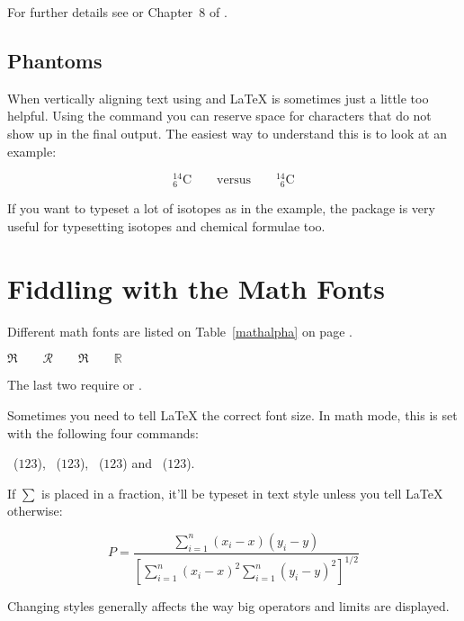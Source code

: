 For further details see \cite{amstestmath} or Chapter~8 of \companion{}.

\subsection{Phantoms}

When vertically aligning text using \ai{\^} and \ai{\_} \LaTeX{} is sometimes
just a little too helpful. Using the  command you can
reserve space for characters that do not show up in the final output.
The easiest way to understand this is to look at an example:
\begin{example}
\begin{equation*}
{}^{14}_{6}\text{C}
\qquad \text{versus} \qquad
{}^{14}_{\phantom{1}6}\text{C}
\end{equation*}
\end{example}
If you want to typeset a lot of isotopes as in the example, the 
package is very useful for typesetting isotopes and chemical formulae too.


\section{Fiddling with the Math Fonts}\label{sec:fontsz}
Different math fonts are listed on Table~\ref{mathalpha} on page
\pageref{mathalpha}.
\begin{example}
 $\Re \qquad
  \mathcal{R} \qquad
  \mathfrak{R} \qquad
  \mathbb{R} \qquad $  
\end{example}
The last two require  or .

Sometimes you need to tell \LaTeX{} the correct font
size. In math mode, this is set with the following four commands:
\begin{flushleft}
~($\displaystyle 123$),
 ~($\textstyle 123$), 
~($\scriptstyle 123$) and
~($\scriptscriptstyle 123$).
\end{flushleft}

If $\sum$ is placed in a fraction, it'll be typeset in text style unless you tell
\LaTeX{} otherwise:
\begin{example}
\begin{equation*}
 P = \frac{\displaystyle{ 
   \sum_{i=1}^n (x_i- x)
   (y_i- y)}} 
   {\displaystyle{\left[
   \sum_{i=1}^n(x_i-x)^2
   \sum_{i=1}^n(y_i- y)^2
   \right]^{1/2}}}
\end{equation*}    
\end{example}
Changing styles generally affects the way big operators and limits are displayed.

